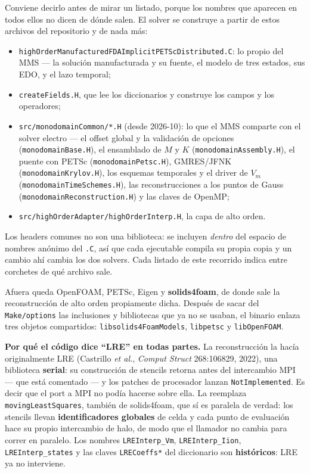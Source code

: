\documentclass[11pt,a4paper]{article}
\begin{document}
Conviene decirlo antes de mirar un listado, porque los nombres que aparecen en
todos ellos no dicen de dónde salen. El solver se construye a partir de estos
archivos del repositorio y de nada más:

\begin{itemize}
  \item \texttt{highOrderManufacturedFDAImplicitPETScDistributed.C}: lo propio
        del MMS --- la solución manufacturada y su fuente, el modelo de tres
        estados, sus EDO, y el lazo temporal;
  \item \texttt{createFields.H}, que lee los diccionarios y construye los campos
        y los operadores;
  \item \texttt{src/monodomainCommon/*.H} (desde 2026-10): lo que el MMS
        comparte con el solver electro --- el offset global y la validación de
        opciones (\texttt{monodomainBase.H}), el ensamblado de $M$ y $K$
        (\texttt{monodomainAssembly.H}), el puente con PETSc
        (\texttt{monodomainPetsc.H}), GMRES/JFNK (\texttt{monodomainKrylov.H}),
        los esquemas temporales y el driver de $V_m$
        (\texttt{monodomainTimeSchemes.H}), las reconstrucciones a los puntos de
        Gauss (\texttt{monodomainReconstruction.H}) y las claves de OpenMP;
  \item \texttt{src/highOrderAdapter/highOrderInterp.H}, la capa de alto orden.
\end{itemize}

Los headers comunes no son una biblioteca: se incluyen \emph{dentro} del espacio
de nombres anónimo del \texttt{.C}, así que cada ejecutable compila su propia
copia y un cambio ahí cambia los dos solvers. Cada listado de este recorrido
indica entre corchetes de qué archivo sale.

Afuera queda OpenFOAM, PETSc, Eigen y \textbf{solids4foam}, de donde sale la
reconstrucción de alto orden propiamente dicha. Después de sacar del
\texttt{Make/options} las inclusiones y bibliotecas que ya no se usaban, el
binario enlaza tres objetos compartidos:
\texttt{libsolids4FoamModels}, \texttt{libpetsc} y \texttt{libOpenFOAM}.

\textbf{Por qué el código dice ``LRE'' en todas partes.} La reconstrucción la
hacía originalmente LRE (Castrillo \emph{et al.}, \emph{Comput Struct}
268:106829, 2022), una biblioteca \textbf{serial}: su construcción de stencils
retorna antes del intercambio MPI --- que está comentado --- y los patches de
procesador lanzan \texttt{NotImplemented}. Es decir que el port a MPI no podía
hacerse sobre ella. La reemplaza \texttt{movingLeastSquares}, también de
solids4foam, que sí es paralela de verdad: los stencils llevan
\textbf{identificadores globales} de celda y cada punto de evaluación hace su
propio intercambio de halo, de modo que el llamador no cambia para correr en
paralelo. Los nombres \texttt{LREInterp\_Vm}, \texttt{LREInterp\_Iion},
\texttt{LREInterp\_states} y las claves \texttt{LRECoeffs*} del diccionario son
\textbf{históricos}: LRE ya no interviene.
\end{document}
